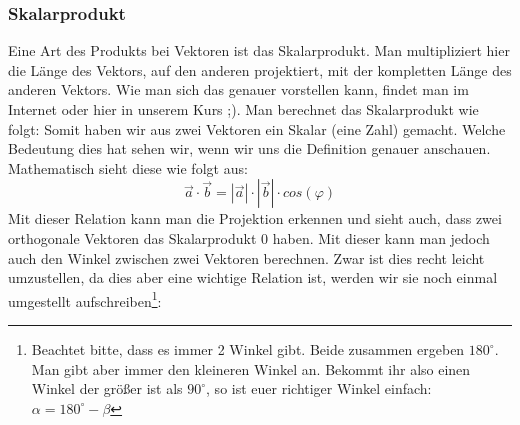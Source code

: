 	\subsubsection{Skalarprodukt}
		Eine Art des Produkts bei Vektoren ist das Skalarprodukt. Man multipliziert
		hier die Länge des Vektors, auf den anderen projektiert, mit der kompletten
		Länge des anderen Vektors. Wie man sich das genauer vorstellen kann, findet
		man im Internet oder hier in unserem Kurs ;). Man berechnet das Skalarprodukt
		wie folgt:
		\formel{\[\vec{a}\cdot \vec{b}=a_1\cdot b_1+a_2\cdot b_2+a_3\cdot b_3\]}
		Somit haben wir aus zwei Vektoren ein Skalar (eine Zahl) gemacht. Welche
		Bedeutung dies hat sehen wir, wenn wir uns die Definition genauer anschauen.
		Mathematisch sieht diese wie folgt aus:
		\[\vec{a}\cdot \vec{b}=|\vec{a}|\cdot |\vec{b}|\cdot cos(\varphi)\]
		Mit dieser Relation kann man die Projektion erkennen und sieht auch, dass zwei
		orthogonale Vektoren das Skalarprodukt 0 haben. Mit dieser kann man jedoch
		auch den Winkel zwischen zwei Vektoren berechnen. Zwar ist dies recht leicht
		umzustellen, da dies aber eine wichtige Relation ist, werden wir sie noch
		einmal umgestellt aufschreiben\footnote{Beachtet bitte, dass es immer 2 Winkel
		gibt. Beide zusammen ergeben \(180^{\circ}\). Man gibt aber immer den
		kleineren Winkel an. Bekommt ihr also einen Winkel der größer ist als
		\(90^{\circ}\), so ist euer richtiger Winkel einfach:
		\(\alpha=180^{\circ}-\beta\)}:
		\formel{\[cos(\varphi)=\frac{ | \vec{a}\cdot \vec{b} | }{|\vec{a}|\cdot
		|\vec{b}|}\]}


